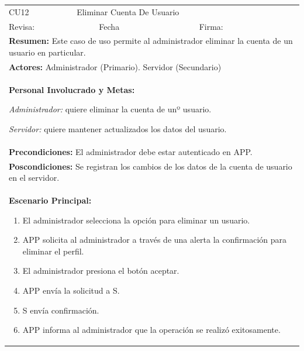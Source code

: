 \begin{longtable}{|l|p{5.5cm}|l|p{2cm}|l|p{1.9cm}|} \hline
    \cellcolor{grisOscuro} CU12 & \multicolumn{4}{|l|}{  \cellcolor{grisOscuro} Eliminar Cuenta De Usuario} &  \cellcolor{grisClaro}\multirow{2}{1cm}{} \\ \cline{1-5}
    \cellcolor{grisOscuro} Revisa: &  \cellcolor{grisClaro} &  \cellcolor{grisOscuro} Fecha &  \cellcolor{grisClaro} &  \cellcolor{grisOscuro} Firma: & \cellcolor{grisClaro} \\ \hline
    \multicolumn{6}{|p{15cm}|}{ \textbf{Resumen: } Este caso de uso permite al administrador eliminar la cuenta de un usuario en particular.

    } \\ \hline

    \multicolumn{6}{|p{15cm}|}{ \textbf{Actores: } Administrador (Primario). Servidor (Secundario)

    } \\ \hline

    \multicolumn{6}{|p{15cm}|}{ \textbf{Personal Involucrado y Metas: }
    
    \emph{Administrador:} quiere eliminar la cuenta de unº usuario.

    \emph{Servidor:} quiere mantener actualizados los datos del usuario.

    } \\ \hline

    \multicolumn{6}{|p{15cm}|}{ \textbf{Precondiciones: } El administrador debe estar autenticado en APP.

    } \\ \hline

    \multicolumn{6}{|p{15cm}|}{ \textbf{Poscondiciones: } Se registran los cambios de los datos de la cuenta de usuario en el servidor.

    } \\ \hline

    \multicolumn{6}{|p{15cm}|}{ \textbf{Escenario Principal: }

    \begin{enumerate}
        \item El administrador selecciona la opción para eliminar un usuario.
        \item APP solicita al administrador a través de una alerta la confirmación para eliminar el perfil.
        \item El administrador presiona el botón aceptar.
        \item APP envía la solicitud a S.
        \item S envía confirmación.
        \item APP informa al administrador que la operación se realizó exitosamente.
    \end{enumerate}

}
\end{longtable}
